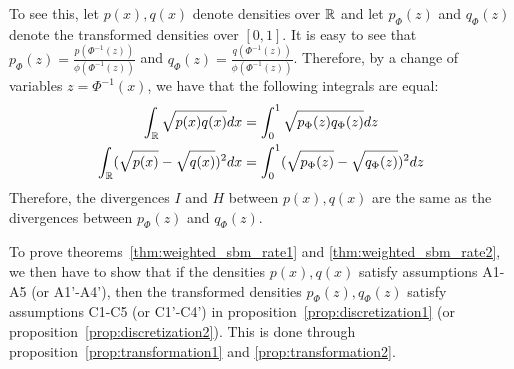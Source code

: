 To see this, let $p(x), q(x)$ denote densities over ${\mathbb R}$ and let $p_{\Phi}(z)$ and $q_{\Phi}(z)$ denote the transformed densities over $[0,1]$. It is easy to see that $p_{\Phi}(z) = \frac{p(\Phi^{-1}(z))}{\phi(\Phi^{-1}(z))}$ and $q_{\Phi}(z) = \frac{q(\Phi^{-1}(z))}{\phi(\Phi^{-1}(z))}$. Therefore, by a change of variables $z = \Phi^{-1}(x)$, we have that the following integrals are equal:
\begin{align*}
\int_{\mathbb R} \sqrt{p(x)q(x)} dx &= \int_0^1 \sqrt{p_{\Phi}(z) q_{\Phi}(z)} dz \\
\int_{\mathbb R} (\sqrt{p(x)} - \sqrt{q(x)})^2 dx &= \int_0^1 (\sqrt{p_{\Phi}(z)} -\sqrt{q_{\Phi}(z)})^2 dz 
\end{align*}
Therefore, the divergences $I$ and $H$ between $p(x), q(x)$ are the same as the divergences between $p_{\Phi}(z)$ and $q_{\Phi}(z)$.

To prove theorems~\ref{thm:weighted_sbm_rate1} and \ref{thm:weighted_sbm_rate2}, we then have to show that if the densities $p(x), q(x)$ satisfy assumptions A1-A5 (or A1'-A4'), then the transformed densities $p_{\Phi}(z), q_{\Phi}(z)$ satisfy assumptions C1-C5 (or C1'-C4') in proposition~\ref{prop:discretization1} (or proposition~\ref{prop:discretization2}). This is done through proposition~\ref{prop:transformation1} and \ref{prop:transformation2}.




